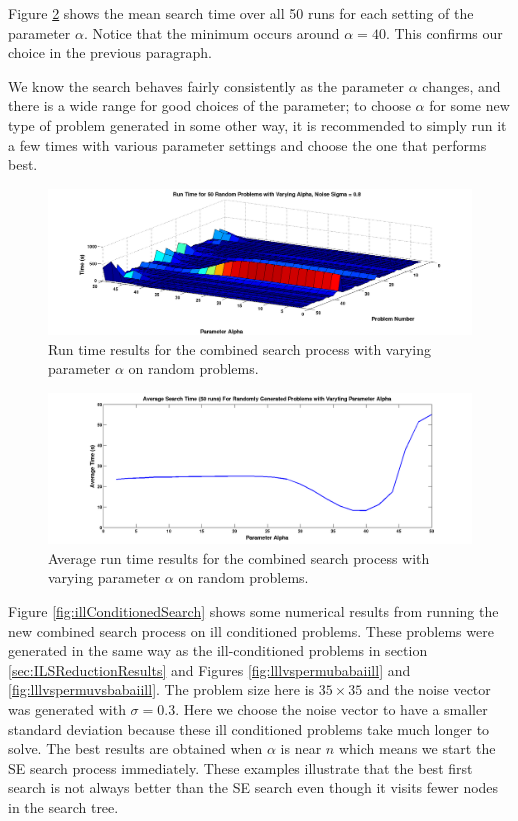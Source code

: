 \documentclass[12pt,Bold,letterpaper]{mcgilletdclass}
\begin{document}
Figure \ref{fig:searchAverage} shows the mean search time over all 50 runs for each setting of the parameter $\alpha$. Notice that the minimum occurs around $\alpha = 40$. This confirms our choice in the previous paragraph.

We know the search behaves fairly consistently as the parameter $\alpha$ changes, and there is a wide range for good choices of the parameter; to choose $\alpha$ for some new type of problem generated in some other way, it is recommended to simply run it a few times with various parameter settings and choose the one that performs best.

\begin{figure}
\centering
\includegraphics[scale=0.36]{searchsurface.png}
\caption{Run time results for the combined search process with varying parameter $\alpha$ on random problems.}
\label{fig:searchsurface}
\end{figure}

\begin{figure}
\centering
\includegraphics[scale=0.36]{averageSearchTimes.png}
\caption{Average run time results for the combined search process with varying parameter $\alpha$ on random problems.}
\label{fig:searchAverage}
\end{figure}

Figure \ref{fig:illConditionedSearch} shows some numerical results from running the new combined search process on ill conditioned problems. These problems were generated in the same way as the ill-conditioned problems in section \ref{sec:ILSReductionResults} and Figures \ref{fig:lllvspermubabaiill} and \ref{fig:lllvspermuvsbabaiill}. The problem size here is $35 \times 35$ and the noise vector was generated with $\sigma = 0.3$. Here we choose the noise vector to have a smaller standard deviation because these ill conditioned problems take much longer to solve. The best results are obtained when $\alpha$ is near $n$ which means we start the SE search process immediately. These examples illustrate that the best first search is not always better than the SE search even though it visits fewer nodes in the search tree.
\end{document}

